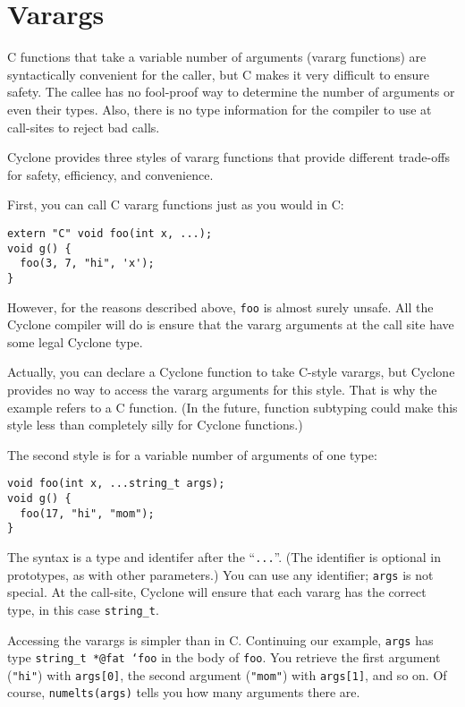 \section{Varargs}

C functions that take a variable number of arguments (vararg
functions) are syntactically convenient for the caller, but C makes it
very difficult to ensure safety.  The callee has no fool-proof way to
determine the number of arguments or even their types.  Also, there is
no type information for the compiler to use at call-sites to reject
bad calls.

Cyclone provides three styles of vararg functions that provide
different trade-offs for safety, efficiency, and convenience.

First, you can call C vararg functions just as you would in C:
\begin{verbatim}
extern "C" void foo(int x, ...);
void g() { 
  foo(3, 7, "hi", 'x');
}
\end{verbatim}
However, for the reasons described above, \texttt{foo} is almost
surely unsafe.  All the Cyclone compiler will do is ensure that the
vararg arguments at the call site have some legal Cyclone type.

Actually, you can declare a Cyclone function to take C-style varargs,
but Cyclone provides no way to access the vararg arguments for this
style.  That is why the example refers to a C function.  (In the
future, function subtyping could make this style less than completely
silly for Cyclone functions.)

The second style is for a variable number of arguments of one type:
\begin{verbatim}
void foo(int x, ...string_t args);
void g() {
  foo(17, "hi", "mom");
}
\end{verbatim}
The syntax is a type and identifer after the ``\texttt{...}''.  (The
identifier is optional in prototypes, as with other parameters.)  You
can use any identifier; \texttt{args} is not special.  At the
call-site, Cyclone will ensure that each vararg has the correct type,
in this case \texttt{string_t}.

Accessing the varargs is simpler than in C.  Continuing our example,
\texttt{args} has type \texttt{string_t *@fat `foo} in the body of
\texttt{foo}.  You retrieve the first argument (\texttt{"hi"}) with
\texttt{args[0]}, the second argument (\texttt{"mom"}) with
\texttt{args[1]}, and so on.  Of course, \texttt{numelts(args)} tells you
how many arguments there are.

